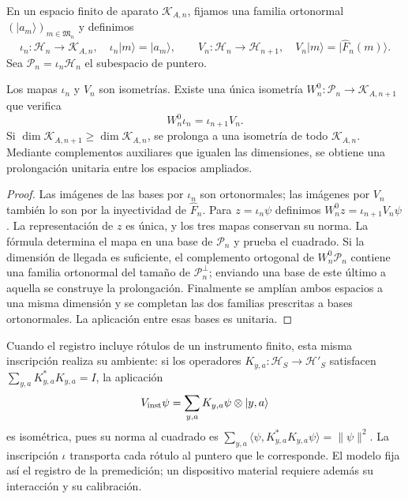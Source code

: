 En un espacio finito de aparato \(\mathcal K_{A,n}\), fijamos una
familia ortonormal \((|a_m\rangle)_{m\in\mathfrak M_n}\) y definimos
\[
 \iota_n:\mathcal H_n\longrightarrow\mathcal K_{A,n},
 \quad \iota_n|m\rangle=|a_m\rangle,
 \qquad
 V_n:\mathcal H_n\longrightarrow\mathcal H_{n+1},
 \quad V_n|m\rangle=|\widehat F_n(m)\rangle.
\]
Sea \(\mathcal P_n=\iota_n\mathcal H_n\) el subespacio de puntero.

\begin{theorem}
\label{vii:thm:observador-entrelazador}
Los mapas \(\iota_n\) y \(V_n\) son isometrías. Existe una única
isometría \(W_n^0:\mathcal P_n\longrightarrow\mathcal K_{A,n+1}\)
que verifica
\begin{equation}
 W_n^0\iota_n=\iota_{n+1}V_n.
 \label{vii:eq:observador-cuadrado}
\end{equation}
Si \(\dim\mathcal K_{A,n+1}\geq\dim\mathcal K_{A,n}\),
se prolonga a una isometría de todo \(\mathcal K_{A,n}\).
Mediante complementos auxiliares que igualen las dimensiones, se obtiene
una prolongación unitaria entre los espacios ampliados.
\end{theorem}

\begin{proof}
Las imágenes de las bases por \(\iota_n\) son ortonormales; las
imágenes por \(V_n\) también lo son por la inyectividad de
\(\widehat F_n\). Para \(z=\iota_n\psi\) definimos
\(W_n^0z=\iota_{n+1}V_n\psi\). La representación de \(z\) es única,
y los tres mapas conservan su norma. La fórmula determina el mapa en
una base de \(\mathcal P_n\) y prueba el cuadrado.
Si la dimensión de llegada es suficiente, el complemento ortogonal de
\(W_n^0\mathcal P_n\) contiene una familia ortonormal del tamaño de
\(\mathcal P_n^\perp\); enviando una base de este último a aquella
se construye la prolongación. Finalmente se amplían ambos espacios a
una misma dimensión y se completan las dos familias prescritas a bases
ortonormales. La aplicación entre esas bases es unitaria.
\end{proof}

Cuando el registro incluye rótulos de un instrumento finito, esta misma
inscripción realiza su ambiente: si los operadores
\(K_{y,a}:\mathcal H_S\to\mathcal H'_S\) satisfacen
\(\sum_{y,a}K_{y,a}^*K_{y,a}=I\), la aplicación
\[
 V_{\rm inst}\psi=\sum_{y,a}K_{y,a}\psi\otimes|y,a\rangle
\]
es isométrica, pues su norma al cuadrado es
\(\sum_{y,a}\langle\psi,K_{y,a}^*K_{y,a}\psi\rangle=\|\psi\|^2\).
La inscripción \(\iota\) transporta cada rótulo al puntero que le
corresponde. El modelo fija así el registro de la premedición; un
dispositivo material requiere además su interacción y su calibración.


